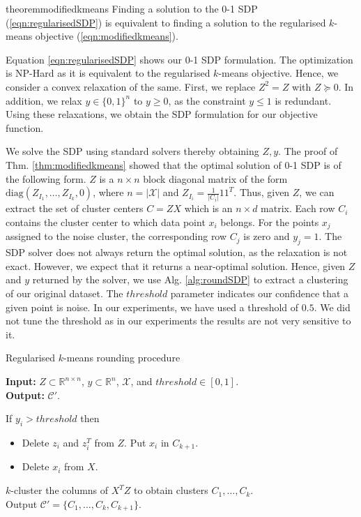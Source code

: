 \documentclass[12pt]{article}
\newcommand{\mc}{\mathcal}
\newcommand{\diag}{\text{diag}}
\begin{document}
\begin{restatable}{theorem}{modifiedkmeans}
\label{thm:modifiedkmeans}
Finding a solution to the 0-1 SDP (\ref{eqn:regularisedSDP}) is equivalent to finding a solution to the regularised $k$-means objective (\ref{eqn:modifiedkmeans}). 
\end{restatable}

Equation \ref{eqn:regularisedSDP} shows our 0-1 SDP formulation. The optimization is NP-Hard as it is equivalent to the regularised $k$-means objective. Hence, we consider a convex relaxation of the same. First, we replace $Z^2 = Z$ with $Z \succeq 0$. In addition, we relax $y \in \{0, 1\}^n$ to $y \geq 0$, as the constraint $y\leq 1$ is redundant. Using these relaxations, we obtain the SDP formulation for our objective function.

We solve the SDP using standard solvers \cite{yang2015sdpnal+} thereby obtaining $Z, y$. 
The proof of Thm. \ref{thm:modifiedkmeans} showed that the optimal solution of 0-1 SDP is of the following form. $Z$ is a $n\times n$ block diagonal matrix of the form $\diag(Z_{I_1}, \ldots, Z_{I_k}, 0)$, where $n = |\mc X|$ and $Z_{I_i} = \frac{1}{|C_i|}11^T$. Thus, given $Z$, we can extract the set of cluster centers $C = ZX$ which is an $n \times d$ matrix. Each row $C_i$ contains the cluster center to which data point $x_i$ belongs. For the points $x_j$ assigned to the noise cluster, the corresponding row $C_j$ is zero and $y_j = 1$. The SDP solver does not always return the optimal solution, as the relaxation is not exact. However, we expect that it returns a near-optimal solution. Hence, given $Z$ and $y$ returned by the solver, we use Alg. \ref{alg:roundSDP} to extract a clustering of our original dataset. The $threshold$ parameter indicates our confidence that a given point is noise. In our experiments, we have used a threshold of $0.5$. We did not tune the threshold as in our experiments the results
are not very sensitive to it.

\begin{algorithm}[t]
\caption{Regularised $k$-means rounding procedure}
\label{alg:roundSDP}
	\textbf{Input: }{ $Z \subset \mathbb{R}^{n\times n}$, $y \subset \mathbb{R}^{n}$, $\mc{X}$, and $threshold \in [0,1]$.}\\
	\textbf{Output: }{$\mc C'$.}
	
	If $y_i > threshold$ then
	\begin{itemize}[nolistsep] 
		\item[] Delete $z_i$ and $z_i^T$ from $Z$. Put $x_i$ in $C_{k+1}$.
		\item[] Delete $x_i$ from $X$.
	\end{itemize}
	$k$-cluster the columns of $X^TZ$ to obtain clusters $C_1, \ldots, C_k$.\\
	Output $\mc C' = \{C_1, \ldots, C_k, C_{k+1}\}$.
\end{algorithm}
\end{document}
